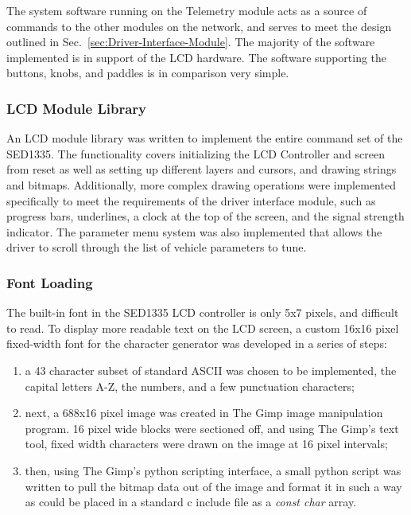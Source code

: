 The system software running on the Telemetry module acts as a source of commands to the other modules on the network, and serves to meet the design outlined in Sec.\ \ref{sec:Driver-Interface-Module}. The majority of the software implemented is in support of the LCD hardware. The software supporting the buttons, knobs, and paddles is in comparison very simple.

\subsubsection{LCD Module Library}

An LCD module library was written to implement the entire command set of the SED1335. The functionality covers initializing the LCD Controller and screen from reset as well as setting up different layers and cursors, and drawing strings and bitmaps. Additionally, more complex drawing operations were implemented specifically to meet the requirements of the driver interface module, such as progress bars, underlines, a clock at the top of the screen, and the signal strength indicator. The parameter menu system was also implemented that allows the driver to scroll through the list of vehicle parameters to tune.

\subsubsection{Font Loading\label{sec:lcd_module_font_loading}}

The built-in font in the SED1335 LCD controller is only 5x7 pixels, and difficult to read. To display more readable text on the LCD screen, a custom 16x16 pixel fixed-width font for the character generator was developed in a series of steps:
\begin{enumerate}
 \item a 43 character subset of standard ASCII was chosen to be implemented, the capital letters A-Z, the numbers, and a few punctuation characters;
 \item next, a 688x16 pixel image was created in The Gimp image manipulation program. 16 pixel wide blocks were sectioned off, and using The Gimp's text tool, fixed width characters were drawn on the image at 16 pixel intervals;
  \item then, using The Gimp's python scripting interface, a small python script was written to pull the bitmap data out of the image and format it in such a way as could be placed in a standard c include file as a \emph{const char} array.
\end{enumerate}

